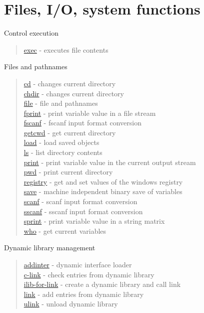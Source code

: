 \chapter*{Files, I/O, system functions}

Control execution 
\begin{quote}
\noindent
\hyperlink{exec}{exec} - {executes file contents} \\ %
\end{quote}

Files and pathnames
\begin{quote}
\noindent
\hyperlink{cd}{cd} - {changes current directory} \\ %
\hyperlink{chdir}{chdir} - {changes current directory} \\ %
\hyperlink{file}{file} - file and pathnames\\
\hyperlink{fprint}{fprint} - print variable value in a file stream\\
\hyperlink{fscanf}{fscanf} - fscanf input format conversion \\
\hyperlink{getcwd}{getcwd} - {get current directory} \\
\hyperlink{load}{load} - load saved objects\\
\hyperlink{ls}{ls} - {list directory contents} \\ %
\hyperlink{print}{print} - print variable value  in the current output stream\\
\hyperlink{pwd}{pwd} - {print current directory} \\ %
\hyperlink{registry}{registry} - get and set values of the windows registry\\
\hyperlink{save}{save} - machine independent binary save of variables\\
\hyperlink{scanf}{scanf} - scanf input format conversion \\
\hyperlink{sscanf}{sscanf} - sscanf input format conversion \\
\hyperlink{sprint}{sprint} - print variable value in a string matrix \\
\hyperlink{who}{who} - get current variables\\
\end{quote}

Dynamic library management
\begin{quote}
\noindent 
\hyperlink{addinter}{addinter} - dynamic interface loader\\
\hyperlink{c_link}{c-link} - check entries from dynamic library \\
\hyperlink{ilib_for_link}{ilib-for-link} - create a dynamic library and call link \\
\hyperlink{link}{link} - add entries from dynamic library \\
\hyperlink{ulink}{ulink} - unload dynamic library \\
\end{quote}

